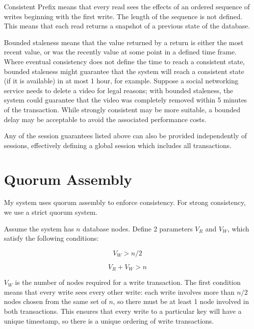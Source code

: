 \documentclass[12pt,a4paper,twoside,openright]{report}
\begin{document}
\begin{description}
\item{Consistent Prefix} means that every read sees the effects of an ordered sequence of writes beginning with the first write. The length of the sequence is not defined. This means that each read returns a snapshot of a previous state of the database. %

\item{Bounded staleness} means that the value returned by a return is either the most recent value, or was the recently value at some point in a defined time frame. Where eventual consistency does not define the time to reach a consistent state, bounded staleness might guarantee that the system will reach a consistent state (if it is available) in at most 1 hour, for example. Suppose a social networking service needs to delete a video for legal reasons; with bounded staleness, the system could guarantee that the video was completely removed within 5 minutes of the transaction. While strongly consistent may be more suitable, a bounded delay may be acceptable to avoid the associated performance costs.

\item{}
Any of the session guarantees listed above can also be provided independently of sessions, effectively defining a global session which includes all transactions.

\end{description}

\section{Quorum Assembly}

My system uses quorum assembly to enforce consistency. For strong consistency, we use a strict quorum system.

Assume the system has $n$ database nodes. Define 2 parameters $V_R$ and $V_W$, which satisfy the following conditions:

$$V_W > n / 2$$

$$V_R + V_W > n$$

$V_W$ is the number of nodes required for a write transaction. The first condition means that every write sees every other write: each write involves more than $n/2$ nodes chosen from the same set of $n$, so there must be at least 1 node involved in both transactions. This ensures that every write to a particular key will have a unique timestamp, so there is a unique ordering of write transactions.
\end{document}

